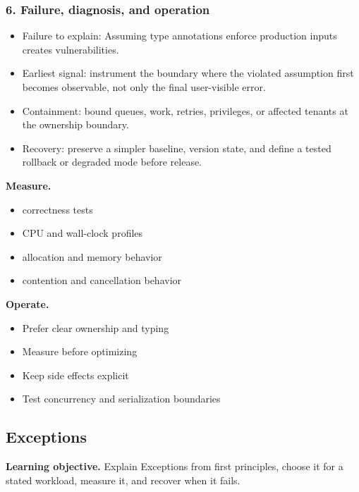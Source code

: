 \subsubsection*{6. Failure, diagnosis, and operation}
\begin{itemize}
\item Failure to explain: Assuming type annotations enforce production inputs creates vulnerabilities.
\item Earliest signal: instrument the boundary where the violated assumption first becomes observable, not only the final user-visible error.
\item Containment: bound queues, work, retries, privileges, or affected tenants at the ownership boundary.
\item Recovery: preserve a simpler baseline, version state, and define a tested rollback or degraded mode before release.
\end{itemize}
\textbf{Measure.}\begin{itemize}
\item correctness tests
\item CPU and wall-clock profiles
\item allocation and memory behavior
\item contention and cancellation behavior
\end{itemize}
\textbf{Operate.}\begin{itemize}
\item Prefer clear ownership and typing
\item Measure before optimizing
\item Keep side effects explicit
\item Test concurrency and serialization boundaries
\end{itemize}
\subsection{Exceptions}
\textbf{Learning objective.} Explain Exceptions from first principles, choose it for a stated workload, measure it, and recover when it fails.
